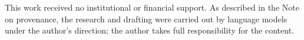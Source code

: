 \documentclass[aps,pra,reprint,superscriptaddress,floatfix]{revtex4-2}
\begin{document}
\begin{acknowledgments}
This work received no institutional or financial support. As described in
the Note on provenance, the research and drafting were carried out by
language models under the author's direction; the author takes full
responsibility for the content.
\end{acknowledgments}



\end{document}
